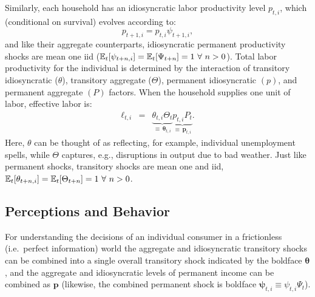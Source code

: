\documentclass[titlepage]{./econtex}
\begin{document}
Similarly, each household has an idiosyncratic labor productivity level $p_{t,i}$, which (conditional on survival) evolves according to:
\begin{equation}
p_{t+1,i} = p_{t,i} \psi_{t+1,i},  \label{eq:IndRandWalk}
\end{equation}
and like their aggregate counterparts, idiosyncratic permanent productivity shocks are mean
one iid ($\operatorname{\mathbb{E}}_{t}[\psi_{t+n,i}]=\operatorname{\mathbb{E}}_{t}[\Psi_{t+n}]= 1~\forall ~n>0$).
Total labor productivity for the individual is determined by the interaction of transitory idiosyncratic
($\theta$), transitory aggregate ($\Theta$), permanent idiosyncratic $({p})$, and permanent aggregate
$({P})$ factors.  When the household supplies one unit of labor, effective labor is:
\begin{eqnarray}
  \label{eq:ell}
   \pmb{\ell}_{t,i} & = & \underbrace{\theta_{t,i}\Theta_{t}}_{\equiv\,\pmb{\theta}_{t,i}}\underbrace{{p}_{t,i} {P}_{t}}_{\equiv\,\pmb{p}_{t,i}}.
\end{eqnarray}
  Here, $\theta$ can be thought of as reflecting, for example, individual unemployment spells, while $\Theta$ captures, e.g., disruptions in output due to bad weather.  Just like permanent shocks, transitory shocks are mean one and iid, $\operatorname{\mathbb{E}}_{t}[\theta_{t+n,i}]=\operatorname{\mathbb{E}}_{t}[\Theta_{t+n}]=1~\forall~n>0$.  


\subsection{Perceptions and Behavior}

For understanding the decisions of an individual consumer in a frictionless (i.e.\ perfect information) world the aggregate and idiosyncratic transitory shocks can be combined into a single overall transitory shock indicated by the boldface $\pmb{\theta}$, and the aggregate and idiosyncratic levels of permanent income can be combined as $\pmb{p}$ (likewise, the combined permanent shock is boldface $\pmb{\psi}_{t,i}\equiv \psi_{t,i} \Psi_{t}$).
\end{document}
